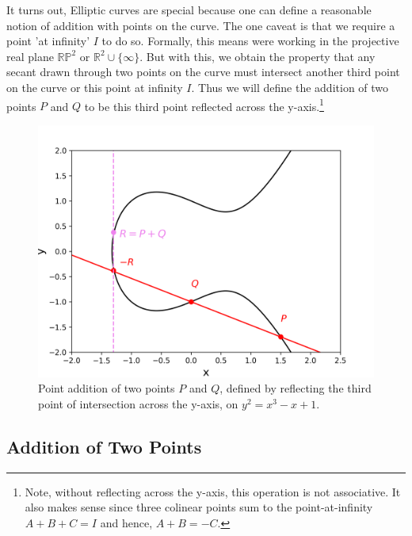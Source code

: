 \documentclass[11pt, a4paper]{report}
\begin{document}
It turns out, Elliptic curves are special because one can define a reasonable notion of addition with points on the curve. The one caveat is that we require a point 'at infinity' $I$ to do so. Formally, this means were working in the projective real plane $\mathbb{RP}^2$ or $\mathbb{R}^2 \cup \lbrace \infty \rbrace$. 
But with this, we obtain the property that any secant drawn through two points on the curve must intersect another third point on the curve or this point at infinity $I$. Thus we will define the addition of two points $P$ and $Q$ to be this third point reflected across the y-axis.\footnote{Note, without reflecting across the y-axis, this operation is not associative. It also makes sense since three colinear points sum to the point-at-infinity $A+B+C=I$ and hence, $A+B=-C$.}

\begin{figure}[ht]
\begin{center}
\includegraphics[width=.8\linewidth]{grouplaw.png} 
\caption{Point addition of two points $P$ and $Q$, defined by reflecting the third point of intersection across the y-axis, on $y^2 = x^3 -x+1$.}
\label{fig:additionEC}
\end{center}
\end{figure}

\subsection{Addition of Two Points}
\end{document}
